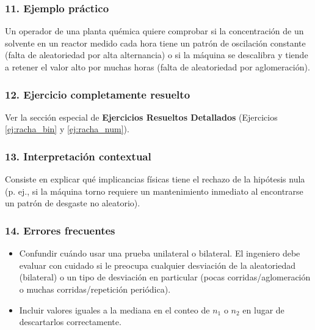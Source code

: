 \documentclass[11pt,a4paper]{article}
\begin{document}
\subsubsection{11. Ejemplo práctico}
Un operador de una planta quémica quiere comprobar si la concentración de un solvente en un reactor medido cada hora tiene un patrón de oscilación constante (falta de aleatoriedad por alta alternancia) o si la máquina se descalibra y tiende a retener el valor alto por muchas horas (falta de aleatoriedad por aglomeración).

\subsubsection{12. Ejercicio completamente resuelto}
Ver la sección especial de \textbf{Ejercicios Resueltos Detallados} (Ejercicios \ref{ej:racha_bin} y \ref{ej:racha_num}).

\subsubsection{13. Interpretación contextual}
Consiste en explicar qué implicancias físicas tiene el rechazo de la hipótesis nula (p. ej., si la máquina torno requiere un mantenimiento inmediato al encontrarse un patrón de desgaste no aleatorio).

\subsubsection{14. Errores frecuentes}
\begin{itemize}
    \item Confundir cuándo usar una prueba unilateral o bilateral. El ingeniero debe evaluar con cuidado si le preocupa cualquier desviación de la aleatoriedad (bilateral) o un tipo de desviación en particular (pocas corridas/aglomeración o muchas corridas/repetición periódica).
    \item Incluir valores iguales a la mediana en el conteo de $n_1$ o $n_2$ en lugar de descartarlos correctamente.
\end{itemize}
\end{document}
